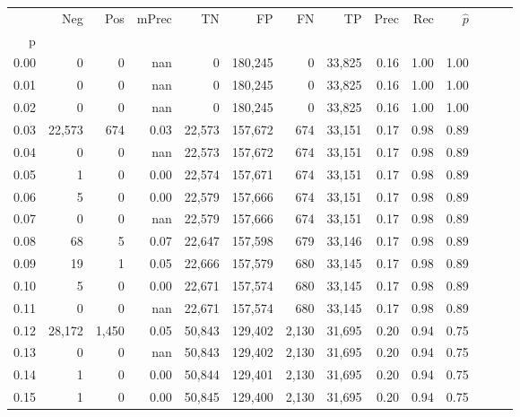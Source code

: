 \begin{tabular}{rrrrrrrrrrrrrr}
\toprule
{} &     Neg &    Pos & mPrec &       TN &       FP &      FN &      TP &  Prec &   Rec & $\hat{p}$ \\
p    &         &        &       &          &          &         &         &       &       &           \\
\midrule
0.00 &       0 &      0 &   nan &        0 &  180,245 &       0 &  33,825 &  0.16 &  1.00 &      1.00 \\
0.01 &       0 &      0 &   nan &        0 &  180,245 &       0 &  33,825 &  0.16 &  1.00 &      1.00 \\
0.02 &       0 &      0 &   nan &        0 &  180,245 &       0 &  33,825 &  0.16 &  1.00 &      1.00 \\
0.03 &  22,573 &    674 &  0.03 &   22,573 &  157,672 &     674 &  33,151 &  0.17 &  0.98 &      0.89 \\
0.04 &       0 &      0 &   nan &   22,573 &  157,672 &     674 &  33,151 &  0.17 &  0.98 &      0.89 \\
0.05 &       1 &      0 &  0.00 &   22,574 &  157,671 &     674 &  33,151 &  0.17 &  0.98 &      0.89 \\
0.06 &       5 &      0 &  0.00 &   22,579 &  157,666 &     674 &  33,151 &  0.17 &  0.98 &      0.89 \\
0.07 &       0 &      0 &   nan &   22,579 &  157,666 &     674 &  33,151 &  0.17 &  0.98 &      0.89 \\
0.08 &      68 &      5 &  0.07 &   22,647 &  157,598 &     679 &  33,146 &  0.17 &  0.98 &      0.89 \\
0.09 &      19 &      1 &  0.05 &   22,666 &  157,579 &     680 &  33,145 &  0.17 &  0.98 &      0.89 \\
0.10 &       5 &      0 &  0.00 &   22,671 &  157,574 &     680 &  33,145 &  0.17 &  0.98 &      0.89 \\
0.11 &       0 &      0 &   nan &   22,671 &  157,574 &     680 &  33,145 &  0.17 &  0.98 &      0.89 \\
0.12 &  28,172 &  1,450 &  0.05 &   50,843 &  129,402 &   2,130 &  31,695 &  0.20 &  0.94 &      0.75 \\
0.13 &       0 &      0 &   nan &   50,843 &  129,402 &   2,130 &  31,695 &  0.20 &  0.94 &      0.75 \\
0.14 &       1 &      0 &  0.00 &   50,844 &  129,401 &   2,130 &  31,695 &  0.20 &  0.94 &      0.75 \\
0.15 &       1 &      0 &  0.00 &   50,845 &  129,400 &   2,130 &  31,695 &  0.20 &  0.94 &      0.75 \\

\end{tabular}
